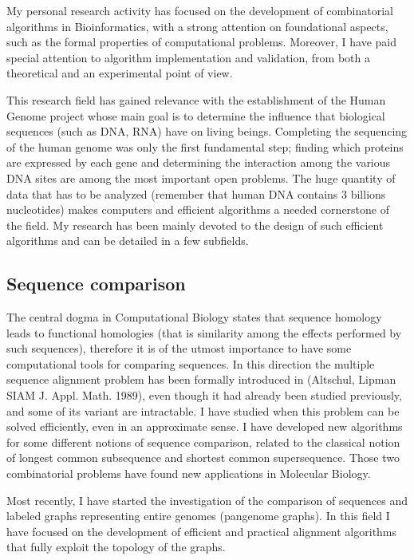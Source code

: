 \documentclass[11pt,a4paper,roman]{moderncv}
\begin{document}
My personal research activity has focused on the development of combinatorial
algorithms in Bioinformatics, with a strong attention on foundational aspects,
such as the formal properties of computational problems.
Moreover, I have paid special attention to algorithm implementation and validation, from both a theoretical and an experimental point of view.


This research field has gained relevance with the establishment of the
Human Genome project whose main goal is to determine the influence that
biological sequences (such as DNA, RNA) have on living beings.
Completing the sequencing of the human genome was only the first
fundamental step; finding which proteins are expressed by each gene and
determining the interaction among the various DNA sites are among the
most important open problems. The huge quantity of data that has to be
analyzed (remember that human DNA contains 3 billions nucleotides) makes
computers and efficient algorithms a needed cornerstone of the field.
My research has been mainly devoted to the design of such
efficient algorithms and can be detailed in a few subfields.

\subsection{Sequence comparison}\label{sequence-comparison}

The central dogma in Computational Biology states that sequence homology
leads to functional homologies (that is similarity among the effects
performed by such sequences), therefore it is of the utmost importance
to have some computational tools for comparing sequences. In this
direction the multiple sequence alignment problem has been formally
introduced in (Altschul, Lipman SIAM J. Appl. Math. 1989), even though
it had already been studied previously, and some of its variant are
intractable. I have studied when this problem can be solved efficiently,
even in an approximate sense. I have developed new algorithms for some
different notions of sequence comparison, related to the classical
notion of longest common subsequence and shortest common supersequence.
Those two combinatorial problems have found new applications in
Molecular Biology.

Most recently, I have started the investigation of the comparison of sequences
and labeled graphs representing entire genomes (pangenome graphs).
In this field I have focused on the development of efficient and practical
alignment algorithms that fully exploit the topology of the graphs.
\end{document}
